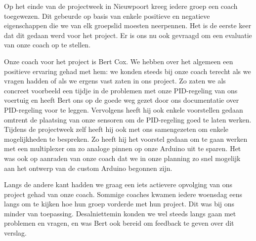 Op het einde van de projectweek in Nieuwpoort kreeg iedere groep een coach toegewezen. Dit gebeurde op basis van enkele positieve en negatieve eigenschappen die we van elk groepslid moesten neerpennen. Het is de eerste keer dat dit gedaan werd voor het project. Er is ons nu ook gevraagd om een evaluatie van onze coach op te stellen.

Onze coach voor het project is Bert Cox. We hebben over het algemeen een positieve ervaring gehad met hem: we konden steeds bij onze coach terecht als we vragen hadden of als we ergens vast zaten in ons project. Zo zaten we als concreet voorbeeld een tijdje in de problemen met onze PID-regeling van ons voertuig en heeft Bert ons op de goede weg gezet door ons documentatie over PID-regeling voor te leggen. Vervolgens heeft hij ook enkele voorstellen gedaan omtrent de plaatsing van onze sensoren om de PID-regeling goed te laten werken. Tijdens de projectweek zelf heeft hij ook met ons samengezeten om enkele mogelijkheden te bespreken. Zo heeft hij het voorstel gedaan om te gaan werken met een multiplexer om zo analoge pinnen op onze Arduino uit te sparen. Het was ook op aanraden van onze coach dat we in onze planning zo snel mogelijk aan het ontwerp van de custom Arduino begonnen zijn. 

Langs de andere kant hadden we graag een iets actievere opvolging van ons project gehad van onze coach. Sommige coaches kwamen iedere woensdag eens langs om te kijken hoe hun groep vorderde met hun project. Dit was bij ons minder van toepassing. Desalniettemin konden we wel steeds langs gaan met problemen en vragen, en was Bert ook bereid om feedback te geven over dit verslag.